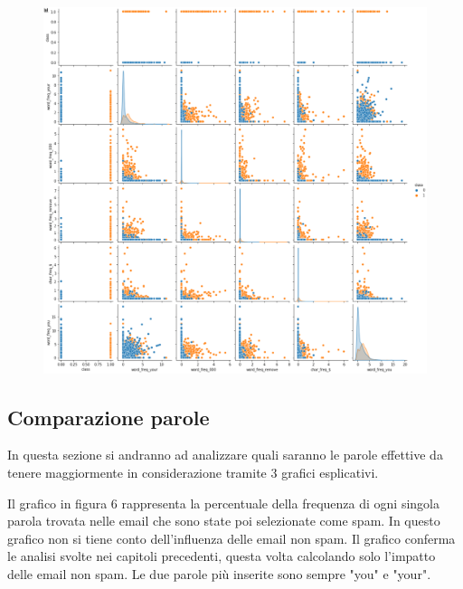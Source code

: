 \documentclass[12pt,a4paper]{article}
\begin{document}
\begin{figure}[H]
    \includegraphics[width=1\columnwidth]{correlation_pair_top_6.png}
    \caption{}
\end{figure}
\clearpage
\subsection{Comparazione parole}
In questa sezione si andranno ad analizzare quali saranno le parole effettive da tenere maggiormente in considerazione tramite 3 grafici esplicativi.


Il grafico in figura 6 rappresenta la percentuale della frequenza di ogni singola parola trovata nelle email che sono state poi selezionate come spam. In questo grafico non si tiene conto dell'influenza delle email non spam. Il grafico conferma le analisi svolte nei capitoli precedenti, questa volta calcolando solo l'impatto delle email non spam. Le due parole più inserite sono sempre "you" e "your".
\end{document}
